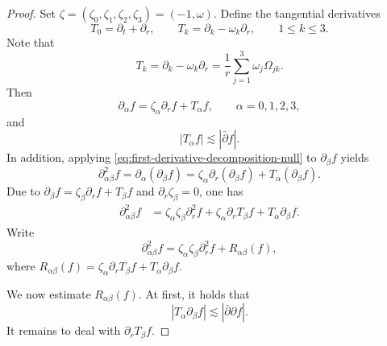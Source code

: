 \documentclass[11pt,twoside]{article}
\theoremstyle{plain}
\theoremstyle{definition}
\theoremstyle{assumption}
\numberwithin{equation}{section}
\begin{document}
	\begin{proof}
		Set $\zeta=(\zeta_0,\zeta_1,\zeta_2,\zeta_3)=(-1,\omega)$.
		Define the tangential derivatives
		\begin{equation*}
			T_0=\partial_t+\partial_r,
			\qquad
			T_k=\partial_k-\omega_k\partial_r,
			\qquad 1\le k\le3.
		\end{equation*}
Note that
\begin{equation}\label{eq:T-angular-identity-null}
			T_k
			=
			\partial_k-\omega_k\partial_r
			=
			\frac1r\sum_{j=1}^3\omega_j\Omega_{jk}.
		\end{equation}
		Then
		\begin{equation}\label{eq:first-derivative-decomposition-null}
			\partial_\alpha f
			=
			\zeta_\alpha\partial_r f+T_\alpha f,
			\qquad
			\alpha=0,1,2,3,
		\end{equation}
		and
		\begin{equation}\label{eq:T-good-control-null}
			|T_\alpha f|
			\lesssim
			|\bar\partial f|.
		\end{equation}
		In addition, applying
		\eqref{eq:first-derivative-decomposition-null} to $\partial_\beta f$ yields
		\begin{equation}\label{eq:second-derivative-start-null}
			\partial_{\alpha\beta}^2 f
			=
			\partial_\alpha(\partial_\beta f)
			=
			\zeta_\alpha\partial_r(\partial_\beta f)
			+
			T_\alpha(\partial_\beta f).
		\end{equation}
		Due to $\partial_\beta f=\zeta_\beta\partial_r f+T_\beta f$ and $\partial_r\zeta_\beta=0$,
		one has
		\begin{equation}\label{eq:second-derivative-expanded-null}
			\begin{aligned}
				\partial_{\alpha\beta}^2 f
				&=
				\zeta_\alpha\zeta_\beta\partial_r^2f
				+
				\zeta_\alpha\partial_rT_\beta f
				+
				T_\alpha\partial_\beta f.
			\end{aligned}
		\end{equation}
		Write
		\begin{equation}\label{eq:second-derivative-decomposition-null}
			\partial_{\alpha\beta}^2 f
			=\zeta_\alpha\zeta_\beta\partial_r^2f
			+R_{\alpha\beta}(f),
		\end{equation}
		where $R_{\alpha\beta}(f)
			=\zeta_\alpha\partial_rT_\beta f
			+T_\alpha\partial_\beta f$.
		
		
		We now estimate $R_{\alpha\beta}(f)$. At first, it holds that
		\begin{equation}\label{eq:Ta-pbeta-control-null}
			|T_\alpha\partial_\beta f|
			\lesssim
			|\bar\partial\partial f|.
		\end{equation}
		It remains to deal with $\partial_rT_\beta f$.
		

\end{proof}
\end{document}
